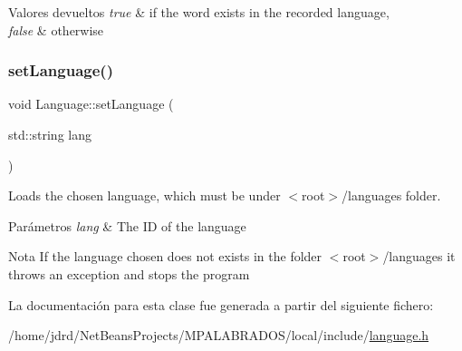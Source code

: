 \begin{DoxyRetVals}{Valores devueltos}
{\em true} & if the word exists in the recorded language, \\
\hline
{\em false} & otherwise \\
\hline
\end{DoxyRetVals}
\mbox{\label{classLanguage_accc1c22d8bba3002a71bea06cecf624b}} 
\subsubsection{\texorpdfstring{set\+Language()}{setLanguage()}}
{\footnotesize\ttfamily void Language\+::set\+Language (\begin{DoxyParamCaption}\item[{std\+::string}]{lang }\end{DoxyParamCaption})}



Loads the chosen language, which must be under $<$root$>$/languages folder. 


\begin{DoxyParams}{Parámetros}
{\em lang} & The ID of the language \\
\hline
\end{DoxyParams}
\begin{DoxyNote}{Nota}
If the language chosen does not exists in the folder $<$root$>$/languages it throws an exception and stops the program 
\end{DoxyNote}


La documentación para esta clase fue generada a partir del siguiente fichero\+:\begin{DoxyCompactItemize}
\item 
/home/jdrd/\+Net\+Beans\+Projects/\+M\+P\+A\+L\+A\+B\+R\+A\+D\+O\+S/local/include/\hyperlink{language_8h}{language.\+h}\end{DoxyCompactItemize}
